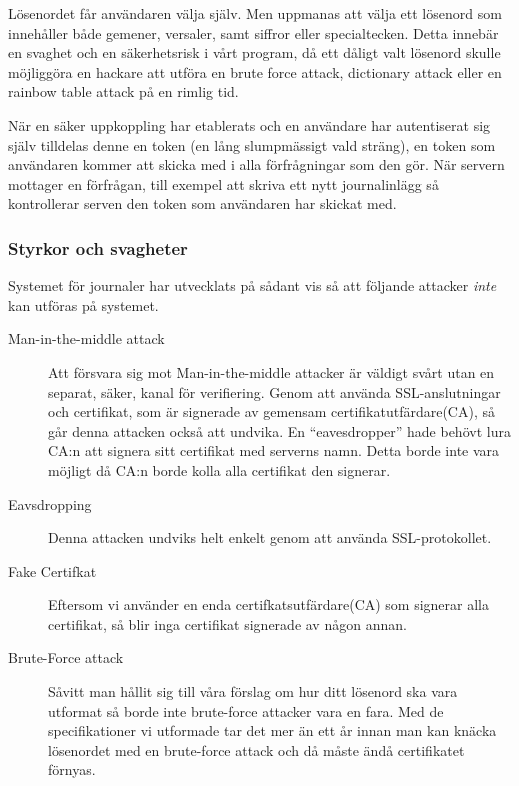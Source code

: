 \documentclass[a4paper]{article}
\begin{document}
Lösenordet får användaren välja själv. Men uppmanas att välja ett lösenord som innehåller både gemener, versaler, samt siffror eller specialtecken. 
Detta innebär en svaghet och en säkerhetsrisk i vårt program, då ett dåligt valt lösenord skulle möjliggöra en hackare att utföra en brute force attack, dictionary attack eller en rainbow table attack på en rimlig tid.

När en säker uppkoppling har etablerats och en användare har autentiserat sig själv tilldelas denne en token (en lång slumpmässigt vald sträng), en token som användaren kommer att skicka med i alla förfrågningar som den gör. När servern mottager en förfrågan, till exempel att skriva ett nytt journalinlägg så kontrollerar serven den token som användaren har skickat med.

\subsubsection{Styrkor och svagheter}
Systemet för journaler har utvecklats på sådant vis så att följande attacker \emph{inte} kan utföras på systemet. 

\begin{description}
\item[Man-in-the-middle attack] Att försvara sig mot Man-in-the-middle attacker är väldigt svårt utan en separat, säker, kanal för verifiering. Genom att använda SSL-anslutningar och certifikat, som är signerade av gemensam certifikatutfärdare(CA), så går denna attacken också att undvika. En “eavesdropper” hade behövt lura CA:n att signera sitt certifikat med serverns namn. Detta borde inte vara möjligt då CA:n borde kolla alla certifikat den signerar.
\item[Eavsdropping] Denna attacken undviks helt enkelt genom att använda SSL-protokollet.
\item[Fake Certifkat] Eftersom vi använder en enda certifkatsutfärdare(CA) som signerar alla certifikat, så blir inga certifikat signerade av någon annan.

\item[Brute-Force attack] Såvitt man hållit sig till våra förslag om hur ditt lösenord ska vara utformat så borde inte brute-force attacker vara en fara. Med de specifikationer vi utformade tar det mer än ett år innan man kan knäcka lösenordet med en brute-force attack och då måste ändå certifikatet förnyas.

\end{description}
\end{document}
